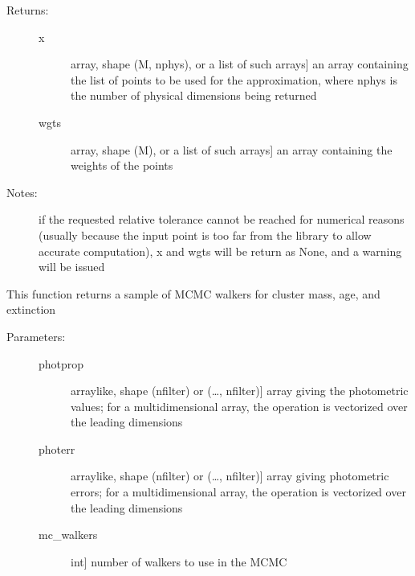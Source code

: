 \documentclass[letterpaper,10pt,english]{sphinxmanual}
\begin{document}
\begin{fulllineitems}
\begin{fulllineitems}
\begin{description}
\item[{Returns:}] \leavevmode\begin{description}
\item[{x}] \leavevmode{[}array, shape (M, nphys), or a list of such arrays{]}
an array containing the list of points to be used for
the approximation, where nphys is the number of
physical dimensions being returned

\item[{wgts}] \leavevmode{[}array, shape (M), or a list of such arrays{]}
an array containing the weights of the points

\end{description}

\item[{Notes:}] \leavevmode
if the requested relative tolerance cannot be reached for
numerical reasons (usually because the input point is too
far from the library to allow accurate computation), x and
wgts will be return as None, and a warning will be issued

\end{description}

\end{fulllineitems}


\begin{fulllineitems}
\label{\detokenize{cluster_slug:slugpy.cluster_slug.cluster_slug.mcmc}}
This function returns a sample of MCMC walkers for cluster
mass, age, and extinction
\begin{description}
\item[{Parameters:}] \leavevmode\begin{description}
\item[{photprop}] \leavevmode{[}arraylike, shape (nfilter) or (…, nfilter){]}
array giving the photometric values; for a
multidimensional array, the operation is vectorized over
the leading dimensions

\item[{photerr}] \leavevmode{[}arraylike, shape (nfilter) or (…, nfilter){]}
array giving photometric errors; for a multidimensional
array, the operation is vectorized over the leading
dimensions

\item[{mc\_walkers}] \leavevmode{[}int{]}
number of walkers to use in the MCMC


\end{description}
\end{description}
\end{fulllineitems}
\end{fulllineitems}
\end{document}
